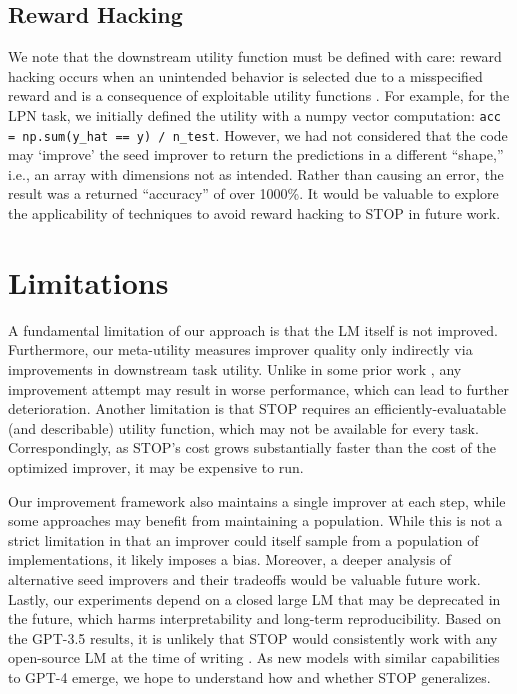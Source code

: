 \documentclass{article} %
\begin{document}
\subsection{Reward Hacking}
%
We note that the downstream utility function must be defined with care: reward hacking occurs when an unintended behavior is selected due to a misspecified reward and is a consequence of exploitable utility functions \citep[see, e.g.,][]{skalse2022defining}. For example, for the LPN task, we initially defined the utility with a numpy vector computation: \lstinline{acc = np.sum(y_hat == y) / n_test}. However, we had not considered that the code may `improve' the seed improver to return the predictions in a different ``shape,'' i.e., an array with dimensions not as intended. Rather than causing an error, the result was a returned ``accuracy'' of over 1000\%.
It would be valuable to explore the applicability of techniques to avoid reward hacking \citep{amodei2016concrete,laidlaw2023preventing} to STOP in future work.
%


%
\section{Limitations}
%
A fundamental limitation of our approach is that the LM itself is not improved. Furthermore, our meta-utility measures improver quality only indirectly via improvements in downstream task utility. %
Unlike in some prior work \citep[e.g.,][]{schmidhuber2003godel}, any improvement attempt may result in worse performance, which can lead to further deterioration.  Another limitation is that STOP requires an efficiently-evaluatable (and describable) utility function, which may not be available for every task. Correspondingly, as STOP's cost grows substantially faster than the cost of the optimized improver, it may be expensive to run.

Our improvement framework also maintains a single improver at each step, while some approaches may benefit from maintaining a population.  While this is not a strict limitation in that an improver could itself sample from a population of implementations, it likely imposes a bias. Moreover, a deeper analysis of alternative seed improvers and their tradeoffs would be valuable future work. Lastly, our experiments depend on a closed large LM that may be deprecated in the future, which harms interpretability and long-term reproducibility. Based on the GPT-3.5 results, it is unlikely that STOP would consistently work with any open-source LM at the time of writing \citep{touvron2023llama,jiang2023mistral}. As new models with similar capabilities to GPT-4 emerge, we hope to understand how and whether STOP generalizes. 
\end{document}
